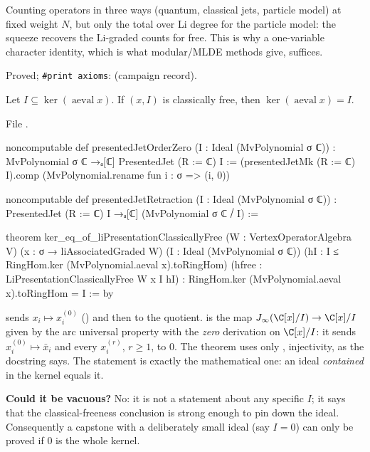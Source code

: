 \begin{physics}
Counting operators in three ways (quantum, classical jets, particle model) at fixed weight $N$, but only
the total over Li degree for the particle model: the squeeze recovers the Li-graded counts for free. This is
why a one-variable character identity, which is what modular/MLDE methods give, suffices.
\end{physics}

\begin{status}
Proved; \texttt{\#print axioms}:  (campaign record).
\end{status}

\begin{theorem}\label{l24:thm:kereq}
Let $I\subseteq\ker(\operatorname{aeval}x)$. If $(x,I)$ is classically free, then $\ker(\operatorname{aeval}x)=I$.
\end{theorem}
\noindent File .
\begin{leancode}
noncomputable def presentedJetOrderZero (I : Ideal (MvPolynomial σ ℂ)) :
    MvPolynomial σ ℂ →ₐ[ℂ] PresentedJet (R := ℂ) I :=
  (presentedJetMk (R := ℂ) I).comp (MvPolynomial.rename fun i : σ => (i, 0))

noncomputable def presentedJetRetraction (I : Ideal (MvPolynomial σ ℂ)) :
    PresentedJet (R := ℂ) I →ₐ[ℂ] (MvPolynomial σ ℂ ⧸ I) :=

theorem ker_eq_of_liPresentationClassicallyFree (W : VertexOperatorAlgebra V)
    (x : σ → liAssociatedGraded W) (I : Ideal (MvPolynomial σ ℂ))
    (hI : I ≤ RingHom.ker (MvPolynomial.aeval x).toRingHom)
    (hfree : LiPresentationClassicallyFree W x I hI) :
    RingHom.ker (MvPolynomial.aeval x).toRingHom = I := by
\end{leancode}

\begin{dictionary}
 sends $x_i\mapsto x_i^{(0)}$ () and then to the
quotient.  is the map $\ltwentyfourJ(\C[x]/I)\to\C[x]/I$ given by the arc universal
property with the \emph{zero} derivation on $\C[x]/I$: it sends $x_i^{(0)}\mapsto\bar x_i$ and every
$x_i^{(r)}$, $r\ge1$, to $0$. The theorem uses only , injectivity, as the docstring says. The
statement is exactly the mathematical one: an ideal \emph{contained} in the kernel equals it.

\textbf{Could it be vacuous?} No: it is not a statement about any specific $I$; it says that the
classical-freeness conclusion is strong enough to pin down the ideal. Consequently a capstone with a
deliberately small ideal (say $I=0$) can only be proved if $0$ is the whole kernel.
\end{dictionary}

